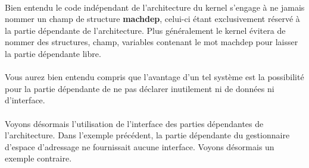 \documentclass[10pt,a4wide]{article}
\begin{document}
\paragraph{}

Bien entendu le code ind\'ependant de l'architecture du kernel s'engage
\`a ne jamais nommer un champ de structure \textbf{machdep}, celui-ci
\'etant exclusivement r\'eserv\'e \`a la partie d\'ependante de l'architecture.
Plus g\'en\'eralement le kernel \'evitera de nommer des structures, champ,
variables contenant le mot machdep pour laisser la partie d\'ependante libre.

\paragraph{}

Vous aurez bien entendu compris que l'avantage d'un tel syst\`eme est la
possibilit\'e pour la partie d\'ependante de ne pas d\'eclarer inutilement
ni de donn\'ees ni d'interface.

\paragraph{}

Voyons d\'esormais l'utilisation de l'interface des parties d\'ependantes
de l'architecture. Dans l'exemple pr\'ec\'edent, la partie d\'ependante
du gestionnaire d'espace d'adressage ne fournissait aucune interface.
Voyons d\'esormais un exemple contraire.
\end{document}
